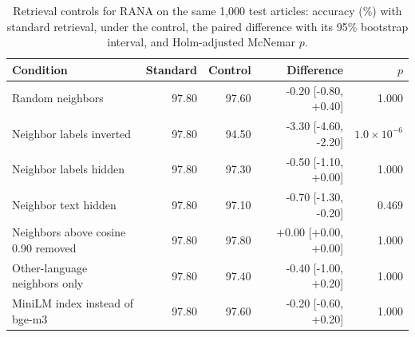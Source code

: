 \begin{table}[t]
\renewcommand{\tblwidth}{\textwidth}%
\small
\centering
\caption{Retrieval controls for RANA on the same 1,000 test articles: accuracy (\%) with standard retrieval, under the control, the paired difference with its 95\% bootstrap interval, and Holm-adjusted McNemar $p$.}\label{tbl_ablation}
\begin{tabular*}{\tblwidth}{@{\extracolsep{\fill}}LRRRR@{}}
\toprule
\textbf{Condition} & \textbf{Standard} & \textbf{Control} & \textbf{Difference} & \textbf{$p$} \\
\midrule
Random neighbors & 97.80 & 97.60 & -0.20 [-0.80, +0.40] & 1.000 \\
Neighbor labels inverted & 97.80 & 94.50 & -3.30 [-4.60, -2.20] & $1.0\times10^{-6}$ \\
Neighbor labels hidden & 97.80 & 97.30 & -0.50 [-1.10, +0.00] & 1.000 \\
Neighbor text hidden & 97.80 & 97.10 & -0.70 [-1.30, -0.20] & 0.469 \\
Neighbors above cosine 0.90 removed & 97.80 & 97.80 & +0.00 [+0.00, +0.00] & 1.000 \\
Other-language neighbors only & 97.80 & 97.40 & -0.40 [-1.00, +0.20] & 1.000 \\
MiniLM index instead of bge-m3 & 97.80 & 97.60 & -0.20 [-0.60, +0.20] & 1.000 \\
\bottomrule
\end{tabular*}
\end{table}
